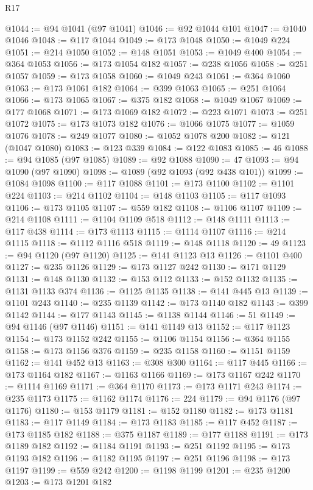 \begin{lexlean}{R17}
\begin{coremodule}
@1044 := @94 @1041 (@97 @1041)
@1046 := @92 @1044 @101
@1047 := @1040 @1046
@1048 := @117 @1044
@1049 := @173 @1048
@1050 := @1049 @224
@1051 := @214 @1050
@1052 := @148 @1051
@1053 := @1049 @400
@1054 := @364 @1053
@1056 := @173 @1054 @182
@1057 := @238 @1056
@1058 := @251 @1057
@1059 := @173 @1058
@1060 := @1049 @243
@1061 := @364 @1060
@1063 := @173 @1061 @182
@1064 := @399 @1063
@1065 := @251 @1064
@1066 := @173 @1065
@1067 := @375 @182
@1068 := @1049 @1067
@1069 := @177 @1068
@1071 := @173 @1069 @182
@1072 := @223 @1071
@1073 := @251 @1072
@1075 := @173 @1073 @182
@1076 := @1066 @1075
@1077 := @1059 @1076
@1078 := @249 @1077
@1080 := @1052 @1078 @200
@1082 := @121 (@1047 @1080)
@1083 := @123 @339
@1084 := @122 @1083
@1085 := 46
@1088 := @94 @1085 (@97 @1085)
@1089 := @92 @1088
@1090 := 47
@1093 := @94 @1090 (@97 @1090)
@1098 := @1089 (@92 @1093 (@92 @438 @101))
@1099 := @1084 @1098
@1100 := @117 @1088
@1101 := @173 @1100
@1102 := @1101 @224
@1103 := @214 @1102
@1104 := @148 @1103
@1105 := @117 @1093
@1106 := @173 @1105
@1107 := @559 @182
@1108 := @1106 @1107
@1109 := @214 @1108
@1111 := @1104 @1109 @518
@1112 := @148 @1111
@1113 := @117 @438
@1114 := @173 @1113
@1115 := @1114 @1107
@1116 := @214 @1115
@1118 := @1112 @1116 @518
@1119 := @148 @1118
@1120 := 49
@1123 := @94 @1120 (@97 @1120)
@1125 := @141 @1123 @13
@1126 := @1101 @400
@1127 := @235 @1126
@1129 := @173 @1127 @242
@1130 := @171 @1129
@1131 := @148 @1130
@1132 := @153 @112
@1133 := @152 @1132
@1135 := @1131 @1133 @374
@1136 := @1125 @1135
@1138 := @141 @445 @13
@1139 := @1101 @243
@1140 := @235 @1139
@1142 := @173 @1140 @182
@1143 := @399 @1142
@1144 := @177 @1143
@1145 := @1138 @1144
@1146 := 51
@1149 := @94 @1146 (@97 @1146)
@1151 := @141 @1149 @13
@1152 := @117 @1123
@1154 := @173 @1152 @242
@1155 := @1106 @1154
@1156 := @364 @1155
@1158 := @173 @1156 @376
@1159 := @235 @1158
@1160 := @1151 @1159
@1162 := @141 @452 @13
@1163 := @308 @300
@1164 := @117 @445
@1166 := @173 @1164 @182
@1167 := @1163 @1166
@1169 := @173 @1167 @242
@1170 := @1114 @1169
@1171 := @364 @1170
@1173 := @173 @1171 @243
@1174 := @235 @1173
@1175 := @1162 @1174
@1176 := 224
@1179 := @94 @1176 (@97 @1176)
@1180 := @153 @1179
@1181 := @152 @1180
@1182 := @173 @1181
@1183 := @117 @1149
@1184 := @173 @1183
@1185 := @117 @452
@1187 := @173 @1185 @182
@1188 := @375 @1187
@1189 := @177 @1188
@1191 := @173 @1189 @182
@1192 := @1184 @1191
@1193 := @251 @1192
@1195 := @173 @1193 @182
@1196 := @1182 @1195
@1197 := @251 @1196
@1198 := @173 @1197
@1199 := @559 @242
@1200 := @1198 @1199
@1201 := @235 @1200
@1203 := @173 @1201 @182

\end{coremodule}
\end{lexlean}
